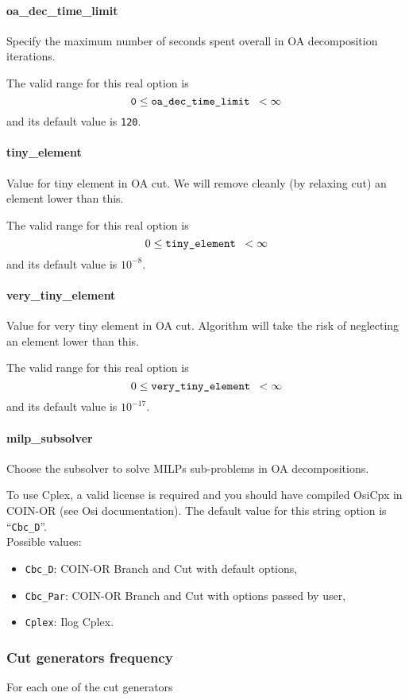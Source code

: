 \paragraph{oa\_dec\_time\_limit}
\label{oa_dec_time_limit}
Specify the maximum number of seconds spent overall in OA decomposition iterations.

 The valid range for this real option is
$${\tt 0} \le \hbox{\tt oa\_dec\_time\_limit } <  \infty$$
and its default value is {\tt 120}.

\paragraph{tiny\_element}
\label{tiny_element}
Value for tiny element in OA cut.
We will remove cleanly (by relaxing cut) an element lower
than this.

The  valid range for this real option is
$$0 \le \hbox{\tt tiny\_element } <  \infty$$
and its default value is $10^{-8}$.

\paragraph{very\_tiny\_element}
\label{very_tiny_element}
Value for very tiny element in OA cut.
Algorithm will take the risk of neglecting an element lower
than this.

The  valid range for this real option is
$$0 \le \hbox{\tt very\_tiny\_element } <  \infty$$
and its default value is $10^{-17}$.

\paragraph{milp\_subsolver}
\label{milp_subsolver}
Choose the subsolver to solve MILPs sub-problems in OA decompositions.

  To use Cplex, a valid license is required and
you should have compiled OsiCpx in COIN-OR  (see Osi documentation).
The default value for this string option is ``{\tt Cbc\_D}''.
\\
Possible values:
\begin{itemize}
   \item {\tt Cbc\_D}: COIN-OR Branch and Cut with default options,
   \item {\tt Cbc\_Par}: COIN-OR Branch and Cut with options passed by user,
   \item {\tt Cplex}: Ilog Cplex.
\end{itemize}


\subsubsection{Cut generators frequency}
For each one of the cut generators
